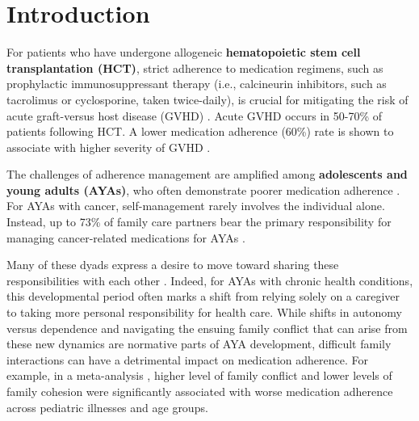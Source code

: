 \section{Introduction}

For patients who have 
undergone allogeneic \textbf{hematopoietic stem cell transplantation (HCT)}, strict adherence to medication regimens, such as prophylactic immunosuppressant therapy (i.e., calcineurin inhibitors, such as tacrolimus or cyclosporine, taken twice-daily), is crucial for mitigating the risk of acute graft-versus host disease (GVHD) \cite{gresch2017medication}. Acute GVHD occurs in 50-70\% of patients following HCT. A lower medication adherence (60\%) rate is shown to associate with higher severity of GVHD \cite{kirsch2014differences}.

The challenges of adherence management are amplified among \textbf{adolescents and young adults (AYAs)}, 
who often demonstrate poorer medication adherence \cite{psihogios2020needle,psihogios2022social,lyons2018theory}. For AYAs with cancer, self-management rarely involves the individual alone. Instead, up to 73\% of family care partners bear the primary responsibility for managing cancer-related medications for AYAs \cite{psihogios2020adherence}. 

Many of these dyads express a desire to move toward sharing these responsibilities with each other \cite{psihogios2020adherence}. Indeed, for AYAs with chronic health conditions, this developmental period often marks a shift from relying solely on a caregiver to taking more personal responsibility for health care. While shifts in autonomy versus dependence and navigating the ensuing family conflict that can arise from these new dynamics are normative parts of AYA development, difficult family interactions can have a detrimental impact on medication adherence. For example, in a meta-analysis \cite{psihogios2019family}, higher level of family conflict and lower levels of family cohesion were significantly associated with worse medication adherence across pediatric illnesses and age groups. 


